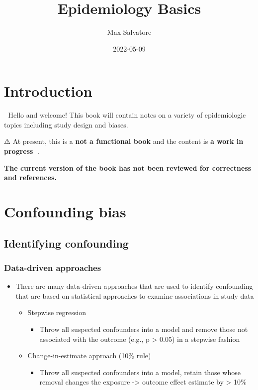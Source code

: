 \documentclass[
]{book}
\title{Epidemiology Basics}
\author{Max Salvatore}
\date{2022-05-09}
\providecommand{\tightlist}{%
  \setlength{\itemsep}{0pt}\setlength{\parskip}{0pt}}
\begin{document}
\maketitle

{
\setcounter{tocdepth}{1}
\tableofcontents
}
\hypertarget{introduction}{%
\chapter{Introduction}\label{introduction}}

👋 Hello and welcome! This book will contain notes on a variety of epidemiologic topics including study design and biases.

⚠️ At present, this is a \textbf{not a functional book} and the content is \textbf{a work in progress} 🔧.

\textbf{The current version of the book has not been reviewed for correctness and references.}

\hypertarget{confounding}{%
\chapter{Confounding bias}\label{confounding}}

\hypertarget{identifying-confounding}{%
\section{Identifying confounding}\label{identifying-confounding}}

\hypertarget{data-driven-approaches}{%
\subsection{Data-driven approaches}\label{data-driven-approaches}}

\begin{itemize}
\tightlist
\item
  There are many data-driven approaches that are used to identify confounding that are based on statistical approaches to examine associations in study data

  \begin{itemize}
  \tightlist
  \item
    Stepwise regression

    \begin{itemize}
    \tightlist
    \item
      Throw all suspected confounders into a model and remove those not associated with the outcome (e.g., p \textgreater{} 0.05) in a stepwise fashion
    \end{itemize}
  \item
    Change-in-estimate approach (10\% rule)

    \begin{itemize}
    \tightlist
    \item
      Throw all suspected confounders into a model, retain those whose removal changes the exposure -\textgreater{} outcome effect estimate by \textgreater{} 10\%
    \end{itemize}
  \end{itemize}
\end{itemize}
\end{document}
